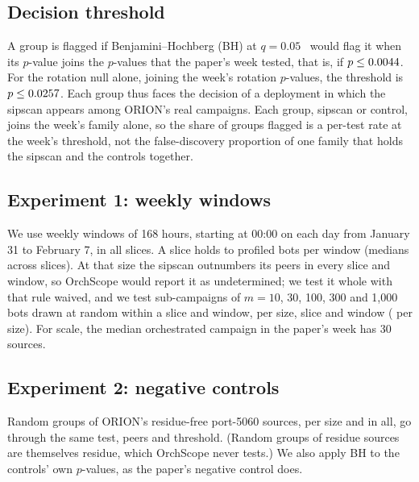 \documentclass[11pt]{article}
\newcommand{\sysname}{OrchScope}
\begin{document}
\subsection{Decision threshold}
A group is flagged if Benjamini--Hochberg (BH) at $q=0.05$~\cite{benjamini1995fdr} would flag it
when its $p$-value joins the \WeekTested{} $p$-values that the paper's week tested, that is, if
$p\le0.0044$. For the rotation null alone, joining the week's rotation $p$-values, the threshold
is $p\le0.0257$. Each group thus faces the decision of a deployment in which the sipscan
appears among ORION's real campaigns. Each group, sipscan or control, joins the week's family
alone, so the share of groups flagged is a per-test rate at the week's threshold, not the
false-discovery proportion of one family that holds the sipscan and the controls together.

\subsection{Experiment 1: weekly windows}
We use \SipWindows{} weekly windows of 168 hours, starting at 00:00 on each day from January 31
to February 7, in all \SipSlices{} slices. A slice holds \SipProfMin{} to \SipProfMax{} profiled bots per window
(medians across slices). At that size the sipscan outnumbers its peers in every slice and window,
so \sysname{} would report it as undetermined; we test it whole with that rule waived, and we test
sub-campaigns of $m=10$, 30, 100, 300 and 1,000 bots drawn at random within a slice and window,
\SipDraws{} per size, slice and window (\SipPerSize{} per size). For scale, the median
orchestrated campaign in the paper's week has 30 sources.

\subsection{Experiment 2: negative controls}
Random groups of ORION's residue-free port-5060 sources, \SipCtlPerSize{} per size and
\SipCtlTotal{} in all, go through the same test, peers and threshold. (Random groups of residue sources are
themselves residue, which \sysname{} never tests.) We also apply BH to the controls' own
$p$-values, as the paper's negative control does.
\end{document}
